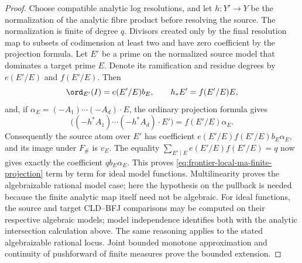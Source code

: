 \begin{proof}
Choose compatible analytic log resolutions, and let \(h:Y'\to Y\) be the
normalization of the analytic fibre product before resolving the source.
The normalization is finite of degree \(q\).  Divisors created
only by the final resolution map to subsets of codimension at least two and
have zero coefficient by the projection formula.  Let \(E'\) be a prime on
the normalized source model that dominates a target prime \(E\).  Denote its
ramification and residue degrees by \(e(E'/E)\) and \(f(E'/E)\).  Then
\begin{equation}
 \ord_{E'}(I)=e(E'/E)b_E,
 \qquad h_*E'=f(E'/E)E,
 \label{eq:frontier-local-ma-finite-ef}
\end{equation}
and, if
\(\alpha_E=(-A_1)\cdots(-A_d)\cdot E\), the ordinary projection formula
gives
\begin{equation}
 \bigl((-h^*A_1)\cdots(-h^*A_d)\cdot E'\bigr)
       =f(E'/E)\alpha_E.
 \label{eq:frontier-local-ma-finite-intersection}
\end{equation}
Consequently the source atom over \(E'\) has coefficient
\(e(E'/E)f(E'/E)b_E\alpha_E\), and its image under \(F_\#\) is
\(v_E\).  The equality
\(\sum_{E'\mid E}e(E'/E)f(E'/E)=q\) now gives exactly the coefficient
\(qb_E\alpha_E\).  This proves
\eqref{eq:frontier-local-ma-finite-projection} term by term for ideal model
functions.  Multilinearity proves the algebraizable rational model case;
here the hypothesis on the pullback is needed because the finite analytic map
itself need not be algebraic.  For ideal functions, the source and target
CLD--BFJ comparisons may be computed on their respective algebraic models;
model independence identifies both with the analytic intersection
calculation above.  The same reasoning applies to the stated algebraizable
rational locus.  Joint bounded monotone approximation and continuity of
pushforward of finite measures prove the bounded extension.


\end{proof}
